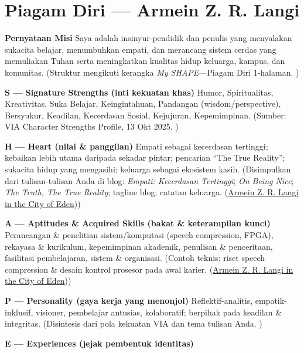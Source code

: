 \documentclass[
  letterpaper,
  DIV=11,
  numbers=noendperiod]{scrreprt}
\begin{document}
\section{Piagam Diri --- Armein Z. R.
Langi}\label{piagam-diri-armein-z.-r.-langi}

\textbf{Pernyataan Misi} Saya adalah insinyur-pendidik dan penulis yang
menyalakan sukacita belajar, menumbuhkan empati, dan merancang sistem
cerdas yang memuliakan Tuhan serta meningkatkan kualitas hidup keluarga,
kampus, dan komunitas. (Struktur mengikuti kerangka \emph{My
SHAPE}---Piagam Diri 1-halaman. )

\textbf{S --- Signature Strengths (inti kekuatan khas)} Humor,
Spiritualitas, Kreativitas, Suka Belajar, Keingintahuan, Pandangan
(wisdom/perspective), Bersyukur, Keadilan, Kecerdasan Sosial, Kejujuran,
Kepemimpinan. (Sumber: VIA Character Strengths Profile, 13 Okt 2025. )

\textbf{H --- Heart (nilai \& panggilan)} Empati sebagai kecerdasan
tertinggi; kebaikan lebih utama daripada sekadar pintar; pencarian ``The
True Reality''; sukacita hidup yang mengasihi; keluarga sebagai
ekosistem kasih. (Disimpulkan dari tulisan-tulisan Anda di blog:
\emph{Empati: Kecerdasan Tertinggi}; \emph{On Being Nice}; \emph{The
Truth, The True Reality}; tagline blog; catatan keluarga.
(\href{https://ii-2100.github.io/all-about-me/}{Armein Z. R. Langi in
the City of Eden}))

\textbf{A --- Aptitudes \& Acquired Skills (bakat \& keterampilan
kunci)} Perancangan \& penelitian sistem/komputasi (speech compression,
FPGA), rekayasa \& kurikulum, kepemimpinan akademik, penulisan \&
penceritaan, fasilitasi pembelajaran, sistem \& organisasi. (Contoh
teknis: riset speech compression \& desain kontrol prosesor pada awal
karier.
(\href{https://ii-2100.github.io/all-about-me/My_Song_for_You/index.html}{Armein
Z. R. Langi in the City of Eden}))

\textbf{P --- Personality (gaya kerja yang menonjol)}
Reflektif-analitis, empatik-inklusif, visioner, pembelajar antusias,
kolaboratif; berpihak pada keadilan \& integritas. (Disintesis dari pola
kekuatan VIA dan tema tulisan Anda. )

\textbf{E --- Experiences (jejak pembentuk identitas)}
\end{document}
